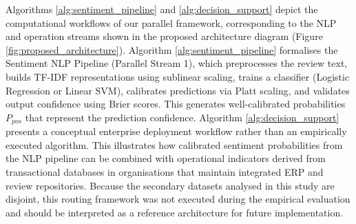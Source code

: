\documentclass[authoryear,review,3p,times,12pt]{elsarticle}
\begin{document}
Algorithms \ref{alg:sentiment_pipeline} and \ref{alg:decision_support} depict the computational workflows of our parallel framework, corresponding to the NLP and operation streams shown in the proposed architecture diagram (Figure \ref{fig:proposed_architecture}). Algorithm \ref{alg:sentiment_pipeline} formalises the Sentiment NLP Pipeline (Parallel Stream 1), which preprocesses the review text, builds TF-IDF representations using sublinear scaling, trains a classifier (Logistic Regression or Linear SVM), calibrates predictions via Platt scaling, and validates output confidence using Brier scores. This generates well-calibrated probabilities $P_{pos}$ that represent the prediction confidence. Algorithm \ref{alg:decision_support} presents a conceptual enterprise deployment workflow rather than an empirically executed algorithm. This illustrates how calibrated sentiment probabilities from the NLP pipeline can be combined with operational indicators derived from transactional databases in organisations that maintain integrated ERP and review repositories. Because the secondary datasets analysed in this study are disjoint, this routing framework was not executed during the empirical evaluation and should be interpreted as a reference architecture for future implementation.
\end{document}
